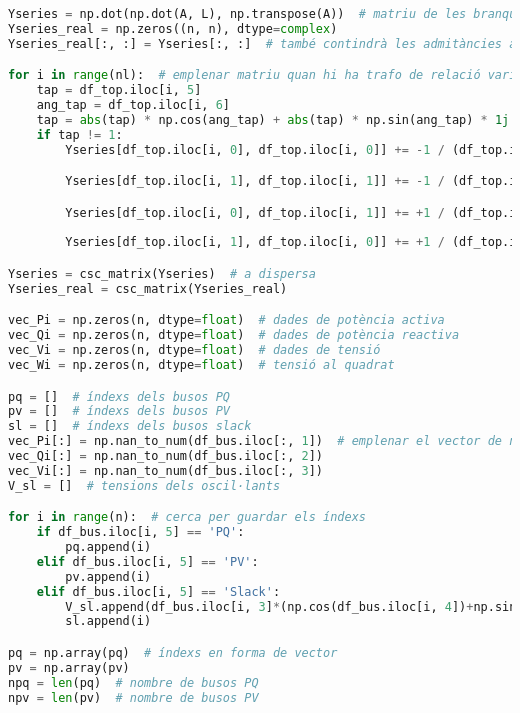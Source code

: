 \begin{lstlisting}[language=Python,numbers=none]
Yseries = np.dot(np.dot(A, L), np.transpose(A))  # matriu de les branques sèrie, es reduirà
Yseries_real = np.zeros((n, n), dtype=complex)
Yseries_real[:, :] = Yseries[:, :]  # també contindrà les admitàncies amb el bus oscil·lant

for i in range(nl):  # emplenar matriu quan hi ha trafo de relació variable
    tap = df_top.iloc[i, 5]
    ang_tap = df_top.iloc[i, 6]
    tap = abs(tap) * np.cos(ang_tap) + abs(tap) * np.sin(ang_tap) * 1j
    if tap != 1:
        Yseries[df_top.iloc[i, 0], df_top.iloc[i, 0]] += -1 / (df_top.iloc[i, 2] + df_top.iloc[i, 3] * 1j) + 1 / (df_top.iloc[i, 2] + df_top.iloc[i, 3] * 1j) / (tap * np.conj(tap))

        Yseries[df_top.iloc[i, 1], df_top.iloc[i, 1]] += -1 / (df_top.iloc[i, 2] + df_top.iloc[i, 3] * 1j) + 1 / (df_top.iloc[i, 2] + df_top.iloc[i, 3] * 1j)

        Yseries[df_top.iloc[i, 0], df_top.iloc[i, 1]] += +1 / (df_top.iloc[i, 2] + df_top.iloc[i, 3] * 1j) + -1 / (df_top.iloc[i, 2] + df_top.iloc[i, 3] * 1j) / np.conj(tap)
        
        Yseries[df_top.iloc[i, 1], df_top.iloc[i, 0]] += +1 / (df_top.iloc[i, 2] + df_top.iloc[i, 3] * 1j) + -1 / (df_top.iloc[i, 2] + df_top.iloc[i, 3] * 1j) / tap

Yseries = csc_matrix(Yseries)  # a dispersa
Yseries_real = csc_matrix(Yseries_real)

vec_Pi = np.zeros(n, dtype=float)  # dades de potència activa
vec_Qi = np.zeros(n, dtype=float)  # dades de potència reactiva
vec_Vi = np.zeros(n, dtype=float)  # dades de tensió
vec_Wi = np.zeros(n, dtype=float)  # tensió al quadrat

pq = []  # índexs dels busos PQ
pv = []  # índexs dels busos PV
sl = []  # índexs dels busos slack
vec_Pi[:] = np.nan_to_num(df_bus.iloc[:, 1])  # emplenar el vector de números
vec_Qi[:] = np.nan_to_num(df_bus.iloc[:, 2])
vec_Vi[:] = np.nan_to_num(df_bus.iloc[:, 3])
V_sl = []  # tensions dels oscil·lants

for i in range(n):  # cerca per guardar els índexs
    if df_bus.iloc[i, 5] == 'PQ':
        pq.append(i)
    elif df_bus.iloc[i, 5] == 'PV':
        pv.append(i)
    elif df_bus.iloc[i, 5] == 'Slack':
        V_sl.append(df_bus.iloc[i, 3]*(np.cos(df_bus.iloc[i, 4])+np.sin(df_bus.iloc[i, 4])*1j))
        sl.append(i)

pq = np.array(pq)  # índexs en forma de vector
pv = np.array(pv)
npq = len(pq)  # nombre de busos PQ
npv = len(pv)  # nombre de busos PV


\end{lstlisting}

